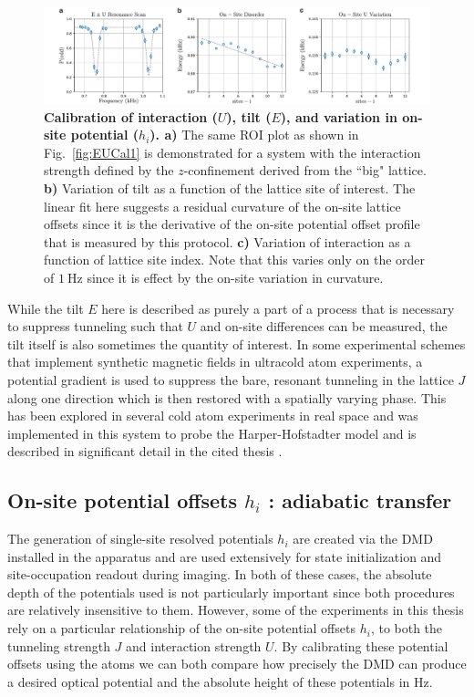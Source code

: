 \begin{figure}[t!]
		\includegraphics[width=\columnwidth]{figures/ch2/E_U_cal/EUCalv2edit.pdf} 
		\caption{\textbf{Calibration of interaction ($U$), tilt ($E$), and variation in on-site potential ($h_i$). a)} The same ROI plot as shown in Fig.~\ref{fig:EUCal1} is demonstrated for a system with the interaction strength defined by the $z$-confinement derived from the ``big" lattice. \textbf{b)} Variation of tilt as a function of the lattice site of interest. The linear fit here suggests a residual curvature of the on-site lattice offsets since it is the derivative of the on-site potential offset profile that is measured by this protocol. \textbf{c)} Variation of interaction as a function of lattice site index. Note that this varies only on the order of $1~\mathrm{Hz}$ since it is effect by the on-site variation in curvature.}
		\label{fig:EUCal2}	
\end{figure}

While the tilt $E$ here is described as purely a part of a process that is necessary to suppress tunneling such that $U$ and on-site differences can be measured, the tilt itself is also sometimes the quantity of interest. In some experimental schemes that implement synthetic magnetic fields in ultracold atom experiments, a potential gradient is used to suppress the bare, resonant tunneling in the lattice $J$ along one direction which is then restored with a spatially varying phase. This has been explored in several cold atom experiments in real space \cite{Aidelsburger2013,Miyake2013} and was implemented in this system to probe the Harper-Hofstadter model\cite{Tai2017} and is described in significant detail in the cited thesis \cite{Tai2017Th}.

\subsection{On-site potential offsets $h_i$ : adiabatic transfer}
\label{sec:DMDpotCal}

The generation of single-site resolved potentials $h_i$ are created via the DMD installed in the apparatus and are used extensively for state initialization and site-occupation readout during imaging. In both of these cases, the absolute depth of the potentials used is not particularly important since both procedures are relatively insensitive to them. However, some of the experiments in this thesis rely on a particular relationship of the on-site potential offsets $h_i$, to both the tunneling strength $J$ and interaction strength $U$. By calibrating these potential offsets using the atoms we can both compare how precisely the DMD can produce a desired optical potential and the absolute height of these potentials in Hz.


